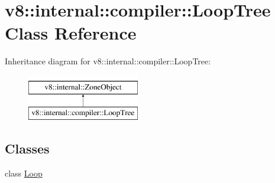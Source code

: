 \hypertarget{classv8_1_1internal_1_1compiler_1_1LoopTree}{}\section{v8\+:\+:internal\+:\+:compiler\+:\+:Loop\+Tree Class Reference}
\label{classv8_1_1internal_1_1compiler_1_1LoopTree}
Inheritance diagram for v8\+:\+:internal\+:\+:compiler\+:\+:Loop\+Tree\+:\begin{figure}[H]
\begin{center}
\leavevmode
\includegraphics[height=2.000000cm]{classv8_1_1internal_1_1compiler_1_1LoopTree}
\end{center}
\end{figure}
\subsection*{Classes}
\begin{DoxyCompactItemize}
\item 
class \mbox{\hyperlink{classv8_1_1internal_1_1compiler_1_1LoopTree_1_1Loop}{Loop}}
\end{DoxyCompactItemize}
